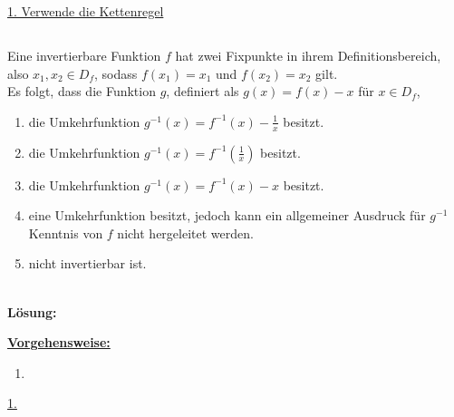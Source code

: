 \underline{1. Verwende die Kettenregel}\\

 


\newpage
\subsection*{}
Eine invertierbare Funktion $f$ hat zwei Fixpunkte in ihrem Definitionsbereich, also $x_1,x_2 \in D_f$, sodass $f(x_1) = x_1$ und $f(x_2) = x_2$ gilt.\\
Es folgt, dass die Funktion $g$, definiert als $g(x) = f(x) - x$ für $x \in D_f$,
\renewcommand{\labelenumi}{(\alph{enumi})}
\begin{enumerate}
	\item 
	die Umkehrfunktion $g^{-1}(x) = f^{-1}(x) - \frac{1}{x} $ besitzt.
	\item
	die Umkehrfunktion $g^{-1}(x) = f^{-1}\left(\frac{1}{x}\right) $ besitzt.
	\item
	die Umkehrfunktion $g^{-1}(x) = f^{-1}(x) - x $ besitzt.
	\item
	eine Umkehrfunktion besitzt, jedoch kann ein allgemeiner Ausdruck für $g^{-1} $ Kenntnis von $f$ nicht hergeleitet werden.
	\item
	nicht invertierbar ist.
\end{enumerate}
\ \\
\textbf{Lösung:}
\begin{mdframed}
\underline{\textbf{Vorgehensweise:}}
\renewcommand{\labelenumi}{\theenumi.}
\begin{enumerate}
\item 
\end{enumerate}
\end{mdframed}

\underline{1. }\\




\newpage

